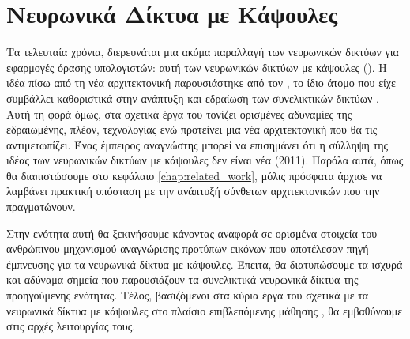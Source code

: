 
\section{Νευρωνικά Δίκτυα με Κάψουλες}
\label{sec:capsule_theory}
Τα τελευταία χρόνια, διερευνάται μια ακόμα παραλλαγή των νευρωνικών δικτύων για εφαρμογές όρασης υπολογιστών: αυτή των νευρωνικών δικτύων με κάψουλες (). Η ιδέα πίσω από τη νέα αρχιτεκτονική παρουσιάστηκε από τον , το ίδιο άτομο που είχε συμβάλλει καθοριστικά στην ανάπτυξη και εδραίωση των συνελικτικών δικτύων \cite{krizhevsky2012imagenet}. Αυτή τη φορά όμως, στα σχετικά έργα του \cite{hinton2011transforming, sabour2017dynamic, hinton2018matrix} τονίζει ορισμένες αδυναμίες της εδραιωμένης, πλέον, τεχνολογίας ενώ προτείνει μια νέα αρχιτεκτονική που θα τις αντιμετωπίζει. Ένας έμπειρος αναγνώστης μπορεί να επισημάνει ότι η σύλληψη της ιδέας των νευρωνικών δικτύων με κάψουλες δεν είναι νέα (2011). Παρόλα αυτά, όπως θα διαπιστώσουμε στο κεφάλαιο \ref{chap:related_work}, μόλις πρόσφατα άρχισε να λαμβάνει πρακτική υπόσταση με την ανάπτυξή σύνθετων αρχιτεκτονικών που την πραγματώνουν.\par

Στην ενότητα αυτή θα ξεκινήσουμε κάνοντας αναφορά σε ορισμένα στοιχεία του ανθρώπινου μηχανισμού αναγνώρισης προτύπων εικόνων που αποτέλεσαν πηγή έμπνευσης για τα νευρωνικά δίκτυα με κάψουλες. Έπειτα, θα διατυπώσουμε τα ισχυρά και αδύναμα σημεία που παρουσιάζουν τα συνελικτικά νευρωνικά δίκτυα της προηγούμενης ενότητας. Τέλος, βασιζόμενοι στα κύρια έργα του  σχετικά με τα νευρωνικά δίκτυα με κάψουλες στο πλαίσιο επιβλεπόμενης μάθησης \cite{hinton2011transforming, sabour2017dynamic, hinton2018matrix}, θα εμβαθύνουμε στις αρχές λειτουργίας τους.\par

